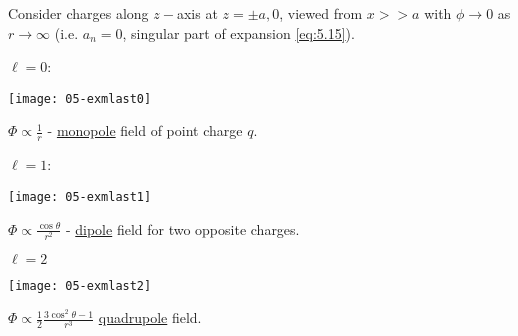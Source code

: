 \begin{example}
	Consider charges along $z-$axis at $z = \pm a, 0$, viewed from $x >> a$ with $\phi \to 0$ as $r \to \infty$ (i.e. $a_n = 0$, singular part of expansion \cref{eq:5.15}).
	
	$\ell = 0$:
	{\par 
    \centering 
    \texttt{[image: 05-exmlast0]} 
	\par}

	$\Phi \propto \frac{1}{r}$ - \underline{monopole} field of point charge $q$.

	$\ell = 1$:
	{\par 
    \centering 
    \texttt{[image: 05-exmlast1]} 
	\par}
	$\Phi \propto \frac{\cos \theta}{r^2}$ - \underline{dipole} field for two opposite charges.

	$\ell = 2$
	{\par 
    \centering 
    \texttt{[image: 05-exmlast2]} 
	\par}
	$\Phi \propto \frac{1}{2} \frac{3 \cos^2 \theta - 1}{r^3}$ \underline{quadrupole} field.
\end{example} 